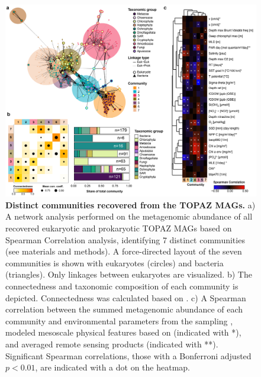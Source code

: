 \documentclass[12pt]{article}
\numberwithin{equation}{section}
\begin{document}
\begin{figure}[h!]    %
    \centering
    \includegraphics[width = \columnwidth]{figures/Figure6-networks.png}
    \caption{ \textbf{Distinct communities recovered from the TOPAZ MAGs.} a) A network analysis performed on the metagenomic abundance of all recovered eukaryotic and prokaryotic TOPAZ MAGs based on Spearman Correlation analysis, identifying 7 distinct communities (see materials and methods). A force-directed layout of the seven communities is shown with eukaryotes (circles) and bacteria (triangles). Only linkages between eukaryotes are visualized.   b) The connectedness and taxonomic composition of each community is depicted. Connectedness was calculated based on . c) A Spearman correlation between the summed metagenomic abundance of each community and environmental parameters from the sampling \citep{taraoceansconsortium2016ecoa}, modeled mesoscale physical features based on \citet{d_Ovidio_2010} (indicated with *), and averaged remote sensing products (indicated with **). Significant Spearman correlations, those with a Bonferroni adjusted $p<0.01$, are indicated with a dot on the heatmap.}    \label{fig:fig6-network}
\end{figure}
\end{document}
